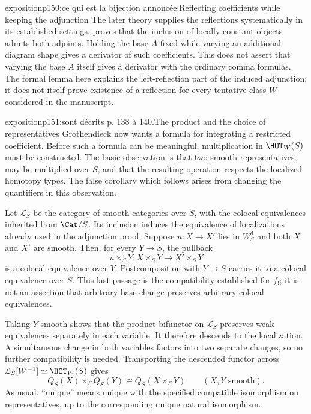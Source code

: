 \begin{dcomment}{exposition}{p150:ce qui est la bijection annoncée.}{Reflecting coefficients while keeping the adjunction}
The later theory supplies the reflections systematically in its established settings. \citet[Proposition~3.9 and Theorem~3.12]{Cisinski2009LocallyConstant} proves that the inclusion of locally constant objects admits both adjoints. Holding the base $A$ fixed while varying an additional diagram shape gives a derivator of such coefficients. This does not assert that varying the base $A$ itself gives a derivator with the ordinary comma formulas. The formal lemma here explains the left-reflection part of the induced adjunction; it does not itself prove existence of a reflection for every tentative class $W$ considered in the manuscript.
\end{dcomment}

\begin{dcomment}{exposition}{p151:sont décrits p. 138 à 140.}{The product and the choice of representatives}
Grothendieck now wants a formula for integrating a restricted coefficient. Before such a formula can be meaningful, multiplication in $\HOT_W(S)$ must be constructed. The basic observation is that two smooth representatives may be multiplied over $S$, and that the resulting operation respects the localized homotopy types. The false corollary which follows arises from changing the quantifiers in this observation.

Let $\mathcal L_S$ be the category of smooth categories over $S$, with the colocal equivalences inherited from $\Cat/S$. Its inclusion induces the equivalence of localizations already used in the adjunction proof. Suppose $u:X\to X'$ lies in $W_S^{\mathrm d}$ and both $X$ and $X'$ are smooth. Then, for every $Y\to S$, the pullback
\[
 u\times_S Y:X\times_S Y\longrightarrow X'\times_S Y
\]
is a colocal equivalence over $Y$. Postcomposition with $Y\to S$ carries it to a colocal equivalence over $S$. This last passage is the compatibility established for $f_!$; it is not an assertion that arbitrary base change preserves arbitrary colocal equivalences.

Taking $Y$ smooth shows that the product bifunctor on $\mathcal L_S$ preserves weak equivalences separately in each variable. It therefore descends to the localization. A simultaneous change in both variables factors into two separate changes, so no further compatibility is needed. Transporting the descended functor across $\mathcal L_S[W^{-1}]\simeq\HOT_W(S)$ gives
\[
 Q_S(X)\times_S Q_S(Y)\cong Q_S(X\times_S Y)
 \qquad(X,Y\text{ smooth}).
\]
As usual, ``unique'' means unique with the specified compatible isomorphism on representatives, up to the corresponding unique natural isomorphism.


\end{dcomment}

